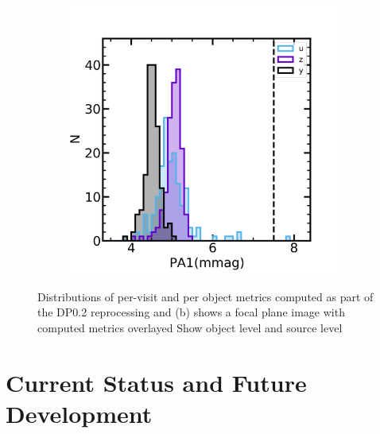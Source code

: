 \begin{figure}[!htp]
\begin{subfigure}{.5\textwidth}
\end{subfigure}%
\begin{subfigure}{.5\textwidth}
    \includegraphics[width=0.98\textwidth]{figures/dp02_pa1_alltracts_uzy}
\end{subfigure}
\par\medskip %
\caption[short]{Distributions of per-visit and per object metrics computed as part of the DP0.2 reprocessing and (b) shows a focal plane image with computed metrics overlayed Show object level and source level }
\label{fig:faro_dp02_distr}
\end{figure}

\section{Current Status and Future Development} \label{sec:future}

